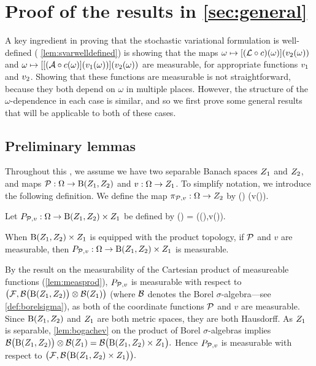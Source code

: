 \section[Proof of the results in Section \MakeLowercase{\ref{sec:general}}]{Proof of the results in \cref{sec:general}}\label{sec:genproof}

A key ingredient in proving that the stochastic variational formulation is well-defined ( \ref{lem:svarwelldefined}) is showing that the maps $\omega \mapsto \mleft[\mleft(\rhs\circ\coeff\mright)(\omega)\mright]\mleft(\vt(\omega)\mright)$ and $\omega \mapsto \mleft[\mleft[(\toform\circ\coeff(\omega)\mright]\mleft(\vo(\omega)\mright)\mright]\mleft(\vt(\omega)\mright)$ are measurable, for appropriate functions $v_{1}$ and $v_{2}$. Showing that these functions are measurable is not straightforward, because they both depend on $\omega$ in multiple places. However, the structure of the $\omega$-dependence in each case is similar, and so we first prove some general results that will be applicable to both of these cases.


\subsection{Preliminary lemmas}\label{sec:prelemmanary}
Throughout this , we assume we have two separable Banach spaces $Z_{1}$ and $Z_{2}$, and maps $\Pmap:\Omega\rightarrow \homspaceZoZt$ and $v:\Omega \rightarrow Z_{1}$. To simplify notation, we introduce the following definition.
We define the map $\pi_{\mathcal P,v}:\Omega\rightarrow Z_{2}$ by
\beq\label{eq:comp}
\compPv(\omega) \de \mleft[\Pmap(\omega)\mright]\mleft(v(\omega)\mright).
\eeq
\ede

Let $\toprodPv:\Omega\rightarrow \homspaceZoZt \times \Zo$ be defined by
\beqs
\toprodPv(\omega) = \mleft(\Pmap(\omega),v(\omega)\mright).
\eeqs
\ede

\label{lem:Pmeas}
When $\homspaceZoZt \times \Zo$ is equipped with the product topology, if $\mathcal P$ and $v$ are measurable, then $\toprodPv:\Omega\rightarrow \homspaceZoZt\times \Zo$ is measurable.
\ele

By the result on the measurability of the Cartesian product of measureable functions (\cref{lem:measprod}), $P_{\mathcal P,v}$ is measurable with respect to $\big(\cF,\bigBorel{\homspaceZoZt}\otimes \Borel{\Zo}\big)$ (where $\mathcal B$ denotes the Borel $\sigma$-algebra---see \cref{def:borelsigma}), as both of the coordinate functions $\mathcal P$ and $v$ are measurable. Since $\homspaceZoZt$ and $Z_{1}$ are both metric spaces, they are both Hausdorff. As $Z_{1}$ is separable, \cref{lem:bogachev} on the product of Borel $\sigma$-algebras implies $\bigBorel{\homspaceZoZt} \otimes \Borel{\Zo} = \bigBorel{\homspaceZoZt \times \Zo}.$ Hence $P_{\mathcal P,v}$ is measurable with respect to $\big(\cF,\bigBorel{\homspaceZoZt\times \Zo}\big).$
\epf

